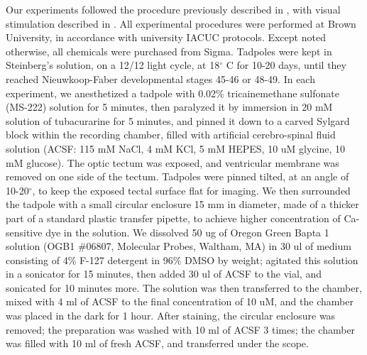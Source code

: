 \documentclass{article}
\begin{document}
Our experiments followed the procedure previously described in \citep{xu2011,truszkowski2017}, with visual stimulation described in \citep{khakhalin2014}. All experimental procedures were performed at Brown University, in accordance with university IACUC protocols. Except noted otherwise, all chemicals were purchased from Sigma. Tadpoles were kept in Steinberg’s solution, on a 12/12 light cycle, at 18$^\circ$ C for 10-20 days, until they reached Nieuwkoop-Faber developmental stages 45-46 or 48-49. In each experiment, we anesthetized a tadpole with 0.02\% tricainemethane sulfonate (MS-222) solution for 5 minutes, then paralyzed it by immersion in 20 mM solution of tubacurarine for 5 minutes, and pinned it down to a carved Sylgard block within the recording chamber, filled with artificial cerebro-spinal fluid solution (ACSF: 115 mM NaCl, 4 mM KCl, 5 mM HEPES, 10 uM glycine, 10 mM glucose). The optic tectum was exposed, and ventricular membrane was removed on one side of the tectum. Tadpoles were pinned tilted, at an angle of 10-20$^\circ$, to keep the exposed tectal surface flat for imaging. We then surrounded the tadpole with a small circular enclosure 15 mm in diameter, made of a thicker part of a standard plastic transfer pipette, to achieve higher concentration of Ca-sensitive dye in the solution. We dissolved 50 ug of Oregon Green Bapta 1 solution (OGB1 $\#$06807, Molecular Probes, Waltham, MA) in 30 ul of medium consisting of 4\% F-127 detergent in 96\% DMSO by weight; agitated this solution in a sonicator for 15 minutes, then added 30 ul of ACSF to the vial, and sonicated for 10 minutes more. The solution was then transferred to the chamber, mixed with 4 ml of ACSF to the final concentration of 10 uM, and the chamber was placed in the dark for 1 hour. After staining, the circular enclosure was removed; the preparation was washed with 10 ml of ACSF 3 times; the chamber was filled with 10 ml of fresh ACSF, and transferred under the scope.
\end{document}
